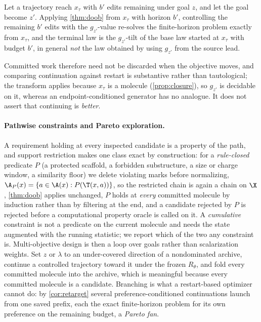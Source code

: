 \begin{corollary}
\label{cor:retarget}
Let a trajectory reach $x_\tau$ with $b'$ edits remaining under goal $z$, and let the goal become $z'$. Applying \cref{thm:doob} from $x_\tau$ with horizon $b'$, controlling the remaining $b'$ edits with the $g_{z'}$-value re-solves the finite-horizon problem exactly from $x_\tau$, and the terminal law is the $g_{z'}$-tilt of the base law started at $x_\tau$ with budget $b'$, in general \emph{not} the law obtained by using $g_{z'}$ from the source lead.
\end{corollary}

Committed work therefore need not be discarded when the objective moves, and comparing continuation against restart is substantive rather than tautological; the transform applies because $x_\tau$ is a molecule (\cref{prop:closure}), so $g_{z'}$ is decidable on it, whereas an endpoint-conditioned generator has no analogue. It does not assert that continuing is \emph{better}.

\paragraph{Pathwise constraints and Pareto exploration.}
\label{sec:pathwise}
A requirement holding at every inspected candidate is a property of the path, and support restriction makes one class exact by construction: for a \emph{rule-closed} predicate $P$ (a protected scaffold, a forbidden substructure, a size or charge window, a similarity floor) we delete violating marks before normalizing, $\A_P(x)=\{a\in\A(x):P(\T(x,a))\}$, so the restricted chain is again a chain on $\X$, \cref{thm:doob} applies unchanged, $P$ holds at \emph{every} committed molecule by induction rather than by filtering at the end, and a candidate rejected by $P$ is rejected before a computational property oracle is called on it.
A \emph{cumulative} constraint is not a predicate on the current molecule and needs the state augmented with the running statistic; we report which of the two any constraint is.
Multi-objective design is then a loop over goals rather than scalarization weights. Set $z$ or $\lambda$ to an under-covered direction of a nondominated archive, continue a controlled trajectory toward it under the frozen $R_\theta$, and fold every committed molecule into the archive, which is meaningful because every committed molecule is a candidate.
Branching is what a restart-based optimizer cannot do: by \cref{cor:retarget} several preference-conditioned continuations launch from one saved prefix, each the exact finite-horizon problem for its own preference on the remaining budget, a \emph{Pareto fan}.
